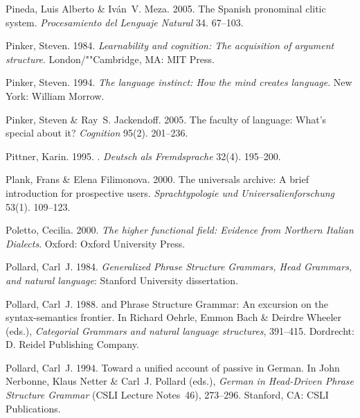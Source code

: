 \begin{thebibliography}{1420}
Pineda, {Luis Alberto} \& Iv\'an~V. Meza. 2005{}.
\newblock The {Spanish} pronominal clitic system.
\newblock \emph{Procesamiento del Lenguaje Natural} 34. 67--103.

Pinker, Steven. 1984.
\newblock \emph{Learnability and cognition: {The} acquisition of argument
  structure}.
\newblock London/""Cambridge, MA: MIT Press.

Pinker, Steven. 1994.
\newblock \emph{The language instinct: {How} the mind creates language}.
\newblock New York: William Morrow.

Pinker, Steven \& Ray~S. Jackendoff. 2005.
\newblock The faculty of language: {What's} special about it?
\newblock \emph{Cognition} 95(2). 201--236.

Pittner, Karin. 1995.
.
\newblock \emph{Deutsch als Fremdsprache} 32(4). 195--200.

Plank, Frans \& Elena Filimonova. 2000.
\newblock The universals archive: {A} brief introduction for prospective users.
\newblock \emph{Sprachtypologie und Universalienforschung} 53(1). 109--123.

Poletto, Cecilia. 2000.
\newblock \emph{The higher functional field: {Evidence} from {Northern Italian
  Dialects}}.
\newblock Oxford: Oxford University Press.

Pollard, Carl~J. 1984.
\newblock \emph{{Generalized Phrase Structure Grammars}, {Head Grammars}, and
  natural language}: Stanford University dissertation.

Pollard, Carl~J. 1988.
 and {Phrase Structure Grammar}: {An} excursion
  on the syntax-semantics frontier.
\newblock In Richard Oehrle, Emmon Bach \& Deirdre Wheeler (eds.),
  \emph{{Categorial Grammars} and natural language structures}, 391--415.
  Dordrecht: D. Reidel Publishing Company.

Pollard, Carl~J. 1994.
\newblock Toward a unified account of passive in {German}.
\newblock In John Nerbonne, Klaus Netter \& Carl~J. Pollard (eds.),
  \emph{German in {Head-Driven Phrase Structure Grammar}} (CSLI Lecture
  Notes~46), 273--296. Stanford, CA: CSLI Publications.


\end{thebibliography}
